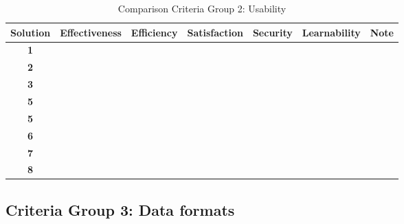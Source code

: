 \begin{table}[htbp]
\centering
\begin{tabular}{|c|l|l|l|l|l|l|}
\hline
\textbf{Solution} & \textbf{Effectiveness} & \textbf{Efficiency} & \textbf{Satisfaction} & \textbf{Security} & \textbf{Learnability} & \textbf{Note} \\ \hline
\textbf{1}        &                        &                     &                       &                   &                       &               \\ \hline
\textbf{2}        &                        &                     &                       &                   &                       &               \\ \hline
\textbf{3}        &                        &                     &                       &                   &                       &               \\ \hline
\textbf{5}        &                        &                     &                       &                   &                       &               \\ \hline
\textbf{5}        &                        &                     &                       &                   &                       &               \\ \hline
\textbf{6}        &                        &                     &                       &                   &                       &               \\ \hline
\textbf{7}        &                        &                     &                       &                   &                       &               \\ \hline
\textbf{8}        &                        &                     &                       &                   &                       &               \\ \hline
\end{tabular}
\caption{Comparison Criteria Group 2: Usability}
\label{tbl_comp_gr_2}
\end{table}

\subsection{Criteria Group 3: Data formats}

